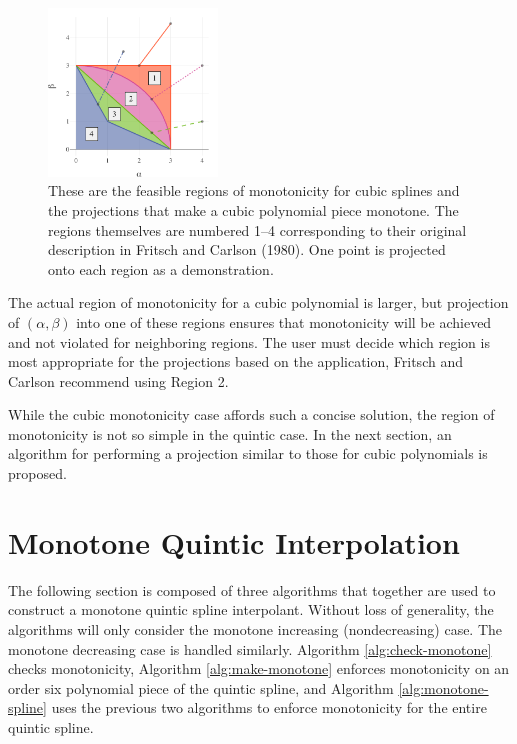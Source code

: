 \documentclass{scspaperproc}
\theoremstyle{scsthe}
\begin{document}
\begin{figure}
  \centering
  \includegraphics[width=0.40\textwidth]{cubic_projection_demonstration}
  \caption{These are the feasible regions of monotonicity for cubic splines and the projections that make a cubic polynomial piece monotone. The regions themselves are numbered 1--4 corresponding to their original description in Fritsch and Carlson (1980). One point is projected onto each region as a demonstration.}\label{fig:projection}
\end{figure}

The actual region of monotonicity for a cubic polynomial is larger, but projection of $(\alpha, \beta)$ into one of these regions ensures that monotonicity will be achieved and not violated for neighboring regions. The user must decide which region is most appropriate for the projections based on the application, Fritsch and Carlson recommend using Region 2.

While the cubic monotonicity case affords such a concise solution, the region of monotonicity is not so simple in the quintic case. In the next section, an algorithm for performing a projection similar to those for cubic polynomials is proposed.

\section{Monotone Quintic Interpolation}
\label{sec:monotone-quintic}

The following section is composed of three algorithms that together are used to construct a monotone quintic spline interpolant. Without loss of generality, the algorithms will only consider the monotone increasing (nondecreasing) case. The monotone decreasing case is handled similarly. Algorithm \ref{alg:check-monotone} checks monotonicity,
Algorithm \ref{alg:make-monotone} enforces monotonicity on an order six
polynomial piece of the quintic spline, and Algorithm
\ref{alg:monotone-spline} uses the previous two algorithms to enforce
monotonicity for the entire quintic spline.
\end{document}
